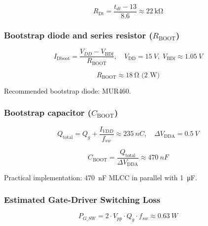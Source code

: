 \[
R_\text{Dt} = \frac{t_{dt} - 13}{8.6} \approx \SI{22}{\kilo\ohm}
\]

\subsubsection{Bootstrap diode and series resistor ($R_\text{BOOT}$)}
\[
I_\text{Dboot} = \frac{V_{DD} - V_\text{BDf}}{R_\text{BOOT}}, \quad V_\text{DD} = \SI{15}{V}, \; V_\text{BDf} \approx \SI{1.05}{V}
\]

\[
R_\text{BOOT} \approx \SI{18}{\ohm} \text{ (2 W)}
\]

Recommended bootstrap diode: MUR460.

\subsubsection{Bootstrap capacitor ($C_\text{BOOT}$)}
\[
Q_\text{total} = Q_g + \frac{I_{VDD}}{f_{sw}} \approx \SI{235}{nC}, \quad \Delta V_\text{DDA} = \SI{0.5}{V}
\]

\[
C_\text{BOOT} = \frac{Q_\text{total}}{\Delta V_\text{DDA}} \approx \SI{470}{nF}
\]

Practical implementation: \SI{470}{\nano\farad} MLCC in parallel with \SI{1}{\micro\farad}.


\subsubsection{Estimated Gate-Driver Switching Loss}
\[
P_{G\_SW} = 2 \cdot V_{pp} \cdot Q_g \cdot f_{sw} \approx \SI{0.63}{W}
\]

